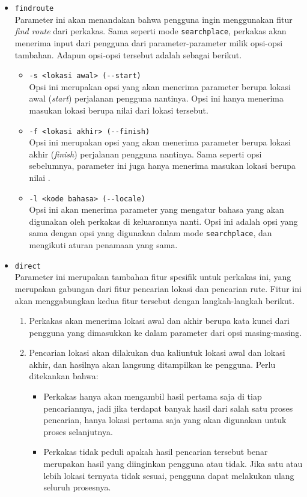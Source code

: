 \begin{itemize}
\begin{itemize}
		\item \verb|findroute|\\
		Parameter ini akan menandakan bahwa pengguna ingin menggunakan fitur \textit{find route} dari perkakas. Sama seperti mode \verb|searchplace|, perkakas akan menerima input dari pengguna dari parameter-parameter milik opsi-opsi tambahan. Adapun opsi-opsi tersebut adalah sebagai berikut.
		
		\begin{itemize}
			\item \verb|-s <lokasi awal> (--start)|\\
			Opsi ini merupakan opsi yang akan menerima parameter berupa lokasi awal (\textit{start}) perjalanan pengguna nantinya. Opsi ini hanya menerima masukan lokasi berupa nilai \latlon\xspace dari lokasi tersebut.
			\item \verb|-f <lokasi akhir> (--finish)|\\
			Opsi ini merupakan opsi yang akan menerima parameter berupa lokasi akhir (\textit{finish}) perjalanan pengguna nantinya. Sama seperti opsi sebelumnya, parameter ini juga hanya menerima masukan lokasi berupa nilai \latlon.
			\item \verb|-l <kode bahasa> (--locale)|\\
			Opsi ini akan menerima parameter yang mengatur bahasa yang akan digunakan oleh perkakas di keluarannya nanti. Opsi ini adalah opsi yang sama dengan opsi yang digunakan dalam mode \verb|searchplace|, dan mengikuti aturan penamaan yang sama.
		\end{itemize}
		
		\item \verb|direct|\\
		Parameter ini merupakan tambahan fitur spesifik untuk perkakas ini, yang merupakan gabungan dari fitur pencarian lokasi dan pencarian rute. Fitur ini akan menggabungkan kedua fitur tersebut dengan langkah-langkah berikut.
		
		\begin{enumerate}
			\item Perkakas akan menerima lokasi awal dan akhir berupa kata kunci dari pengguna yang dimasukkan ke dalam parameter dari opsi masing-masing.
			\item Pencarian lokasi akan dilakukan dua kali\textemdash untuk lokasi awal dan lokasi akhir, dan hasilnya akan langsung ditampilkan ke pengguna. Perlu ditekankan bahwa:
			\newpage\vspace*{-1.5em} %
			\begin{itemize}
				\item Perkakas hanya akan mengambil hasil pertama saja di tiap pencariannya, jadi jika terdapat banyak hasil dari salah satu proses pencarian, hanya lokasi pertama saja yang akan digunakan untuk proses selanjutnya.
				\item Perkakas tidak peduli apakah hasil pencarian tersebut benar merupakan hasil yang diinginkan pengguna atau tidak. Jika satu atau lebih lokasi ternyata tidak sesuai, pengguna dapat melakukan ulang seluruh prosesnya.
			\end{itemize}
			

\end{enumerate}
\end{itemize}
\end{itemize}
